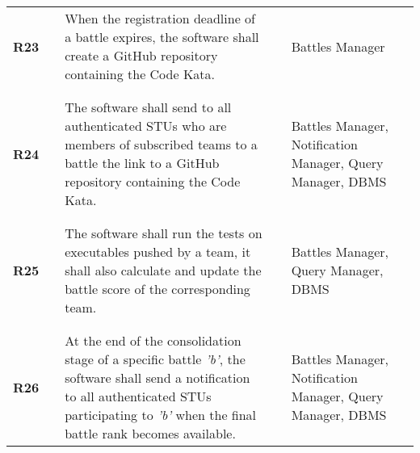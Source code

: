 \begin{longtable}[H]{l l p{6cm} l p{4cm} l}
    \textbf{R23}            & \vline & When the registration deadline of a battle expires, the software shall create a GitHub repository containing the Code Kata.                                                                                                                                                  & \vline &  Battles Manager \\          
                            &        &                                                                                                                                                                                                                                                                              &        &       \\\hline  & & \\ 
    \textbf{R24}            & \vline & The software shall send to all authenticated STUs who are members of subscribed teams to a battle the link to a GitHub repository containing the Code Kata.                                                                                                                  & \vline &  Battles Manager, Notification Manager, Query Manager, DBMS \\          
                            &        &                                                                                                                                                                                                                                                                              &        &       \\\hline  & & \\ 
    \textbf{R25}            & \vline & The software shall run the tests on executables pushed by a team, it shall also calculate and update the battle score of the corresponding team.                                                                                                                             & \vline &  Battles Manager, Query Manager, DBMS \\          
                            &        &                                                                                                                                                                                                                                                                              &        &       \\\hline  & & \\ 
    \textbf{R26}            & \vline & At the end of the consolidation stage of a specific battle \textit{'b'}, the software shall send a notification to all authenticated STUs participating to \textit{'b'} when the final battle rank becomes available.                                                        & \vline &  Battles Manager, Notification Manager, Query Manager, DBMS \\          

\end{longtable}
